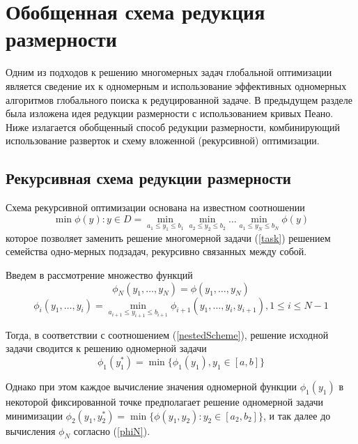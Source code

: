 \section{Обобщенная схема редукция размерности}
Одним из подходов к решению многомерных задач глобальной оптимизации является сведение их к одномерным и использование эффективных одномерных алгоритмов глобального поиска к редуцированной задаче. В предыдущем разделе была изложена идея редукции размерности с использованием кривых Пеано. Ниже излагается обобщенный способ редукции размерности, комбинирующий использование разверток и схему вложенной (рекурсивной) оптимизации.
\subsection{Рекурсивная схема редукции размерности}
Схема рекурсивной оптимизации основана на известном \cite{gorodGrishOptBook} соотношении
\begin{equation}
\label{nestedScheme}
\min{\phi(y):y\in D}=\min_{a_1\leqslant y_1\leqslant b_1}\min_{a_2\leqslant y_2\leqslant b_2}\dots\min_{a_1\leqslant y_N\leqslant b_N}\phi(y)
\end{equation}
которое позволяет заменить решение многомерной задачи (\ref{task}) решением семейства одно-мерных подзадач, рекурсивно связанных между собой.
\par
Введем в рассмотрение множество функций 
\begin{equation}
\label{phiN}
\phi_N(y_1,\dots,y_N)=\phi(y_1,\dots,y_N)
\end{equation}
\begin{equation}
\phi_i(y_1,\dots,y_i)=\min_{a_{i+1}\leqslant y_{i+1} \leqslant b_{i+1}}\phi_{i+1}(y_1,\dots,y_i,y_{i+1}),1\leqslant i\leqslant N-1
\end{equation}
\par
Тогда, в соответствии с соотношением (\ref{nestedScheme}), решение исходной задачи  сводится к решению одномерной задачи
\begin{equation}
\label{phiFirst}
\phi_1(y_1^*)=\min\{\phi_1(y_1),y_1\in [a,b]\}
\end{equation}
\par
Однако при этом каждое вычисление значения одномерной функции \(\phi_1(y_1)\) в некоторой фиксированной точке предполагает решение одномерной задачи минимизации \(\phi_2(y_1,y_2^*)=\min\{\phi(y_1,y_2):y_2\in [a_2,b_2]\}\), и так далее до вычисления \(\phi_N\) согласно (\ref{phiN}).

